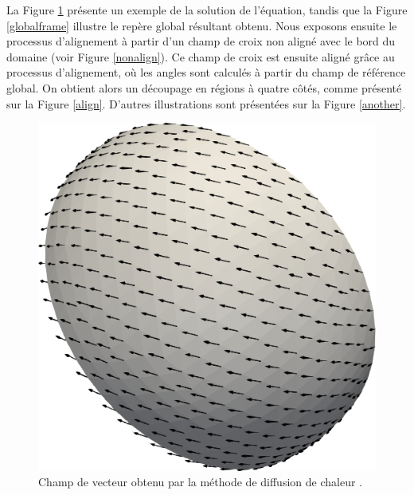 La Figure \ref{solutionheat} présente un exemple de la solution de l'équation, tandis que la Figure \ref{globalframe} illustre le repère global résultant obtenu. Nous exposons ensuite le processus d'alignement à partir d'un champ de croix non aligné avec le bord du domaine (voir Figure \ref{nonalign}). Ce champ de croix est ensuite aligné grâce au processus d'alignement, où les angles sont calculés à partir du champ de référence global. On obtient alors un découpage en régions à quatre côtés, comme présenté sur la Figure \ref{align}. D'autres illustrations sont présentées sur la Figure \ref{another}.

\begin{figure}[!h]
\centering
\includegraphics[scale=0.4]{images/vector.png}
\caption{Champ de vecteur obtenu par la méthode de diffusion de chaleur \cite{sharp2019vector}.}
\label{solutionheat}
\end{figure}

